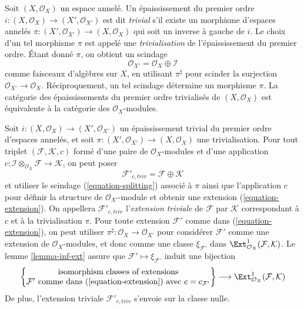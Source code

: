 \begin{remark}
\label{remark-trivial-thickening}
Soit $(X, \mathcal{O}_X)$ un espace annelé. Un épaississement du premier ordre
$i : (X, \mathcal{O}_X) \to (X', \mathcal{O}_{X'})$ est dit
{\it trivial} s'il existe un morphisme d'espaces annelés
$\pi : (X', \mathcal{O}_{X'}) \to (X, \mathcal{O}_X)$ qui soit un
inverse à gauche de $i$. Le choix d'un tel morphisme
$\pi$ est appelé une {\it trivialisation} de l'épaississement du premier ordre.
Étant donné $\pi$, on obtient un scindage
\begin{equation}
\label{equation-splitting}
\mathcal{O}_{X'} = \mathcal{O}_X \oplus \mathcal{I}
\end{equation}
comme faisceaux d'algèbres sur $X$, en utilisant $\pi^\sharp$ pour scinder la surjection
$\mathcal{O}_{X'} \to \mathcal{O}_X$. Réciproquement, un tel scindage détermine
un morphisme $\pi$. La catégorie des épaississements du premier ordre trivialisés de
$(X, \mathcal{O}_X)$ est équivalente à la catégorie des
$\mathcal{O}_X$-modules.
\end{remark}

\begin{remark}
\label{remark-trivial-extension}
Soit $i : (X, \mathcal{O}_X) \to (X', \mathcal{O}_{X'})$
un épaississement trivial du premier ordre d'espaces annelés,
et soit $\pi : (X', \mathcal{O}_{X'}) \to (X, \mathcal{O}_X)$
une trivialisation. Pour tout triplet
$(\mathcal{F}, \mathcal{K}, c)$ formé d'une paire de
$\mathcal{O}_X$-modules et d'une application
$c : \mathcal{I} \otimes_{\mathcal{O}_X} \mathcal{F} \to \mathcal{K}$,
on peut poser
$$
\mathcal{F}'_{c, triv} = \mathcal{F} \oplus \mathcal{K}
$$
et utiliser le scindage (\ref{equation-splitting}) associé à $\pi$
ainsi que l'application $c$ pour définir la structure de $\mathcal{O}_{X'}$-module
et obtenir une extension (\ref{equation-extension}). On appellera
$\mathcal{F}'_{c, triv}$ l'{\it extension triviale} de $\mathcal{F}$
par $\mathcal{K}$ correspondant
à $c$ et à la trivialisation $\pi$. Pour toute extension
$\mathcal{F}'$ comme dans (\ref{equation-extension}), on peut utiliser
$\pi^\sharp : \mathcal{O}_X \to \mathcal{O}_{X'}$ pour considérer $\mathcal{F}'$
comme une extension de $\mathcal{O}_X$-modules, et donc comme une classe $\xi_{\mathcal{F}'}$
dans $\Ext^1_{\mathcal{O}_X}(\mathcal{F}, \mathcal{K})$.
Le lemme \ref{lemma-inf-ext} assure que
$\mathcal{F}' \mapsto \xi_{\mathcal{F}'}$
induit une bijection
$$
\left\{
\begin{matrix}
\text{isomorphism classes of extensions}\\
\mathcal{F}'\text{ comme dans (\ref{equation-extension}) avec }c = c_{\mathcal{F}'}
\end{matrix}
\right\}
\longrightarrow
\Ext^1_{\mathcal{O}_X}(\mathcal{F}, \mathcal{K})
$$
De plus, l'extension triviale $\mathcal{F}'_{c, triv}$ s'envoie sur la classe nulle.
\end{remark}

